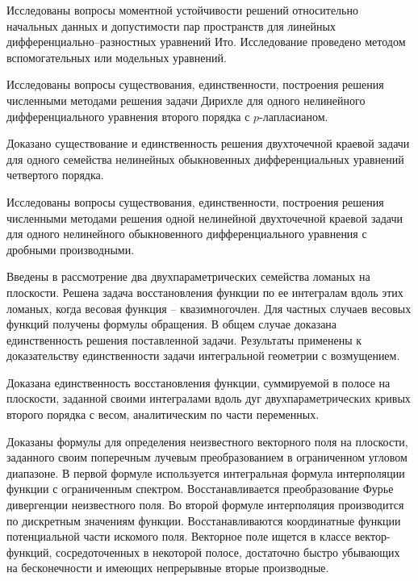 Исследованы вопросы моментной устойчивости решений  относительно начальных данных и допустимости пар пространств для линейных дифференциально--разностных уравнений Ито. Исследование проведено методом вспомогательных или модельных уравнений.








Исследованы вопросы существования, единственности, построения решения численными методами решения задачи Дирихле для одного нелинейного дифференциального уравнения второго порядка с $p$-лапласианом.


Доказано существование и единственность решения двухточечной краевой задачи для одного семейства нелинейных обыкновенных дифференциальных уравнений четвертого порядка.


Исследованы вопросы существования, единственности, построения решения численными методами решения одной нелинейной двухточечной краевой задачи для одного нелинейного обыкновенного дифференциального уравнения с дробными производными.





Введены в рассмотрение два двухпараметрических семейства ломаных на плоскости. Решена задача восстановления функции по ее интегралам вдоль этих ломаных, когда весовая функция – квазимногочлен. Для частных случаев весовых функций получены формулы обращения. В общем случае доказана единственность решения поставленной задачи. Результаты применены к доказательству единственности задачи интегральной геометрии с возмущением.


Доказана единственность восстановления функции, суммируемой в полосе на плоскости, заданной своими интегралами вдоль дуг двухпараметрических кривых второго порядка с весом, аналитическим по части переменных.

Доказаны формулы для определения неизвестного векторного поля на плоскости, заданного своим поперечным лучевым преобразованием в ограниченном угловом диапазоне. В первой формуле используется интегральная формула интерполяции функции с ограниченным спектром. Восстанавливается преобразование Фурье дивергенции неизвестного поля. Во второй формуле интерполяция производится по дискретным значениям функции. Восстанавливаются координатные функции потенциальной части искомого поля. Векторное поле ищется в классе вектор-функций, сосредоточенных в некоторой полосе, достаточно быстро убывающих на бесконечности и имеющих непрерывные вторые производные.








